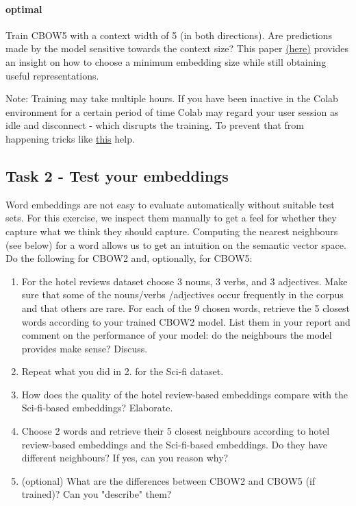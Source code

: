 \documentclass[fleqn,10pt]{SelfArx} %
\begin{document}
\paragraph{optimal} Train CBOW5 with a context width of 5 (in both directions). Are predictions made by the model sensitive towards the context size? This paper \href{https://aclanthology.org/I17-2006/}{(here)} provides an insight on how to choose a minimum embedding size while still obtaining useful representations.

Note: Training may take multiple hours. If you have been inactive in the Colab environment for a certain period of time Colab may regard your user session as idle and disconnect - which disrupts the training. To prevent that from happening tricks like \href{https://gist.github.com/RodolfoFerro/a12c664330c6eae601e5a828adfb8306}{this} help.

\subsection{Task 2 - Test your embeddings}
Word embeddings are not easy to evaluate automatically without suitable test sets. For this exercise, we inspect them manually to get a feel for whether they capture what we think they should capture. Computing the nearest neighbours (see below) for a word allows us to get an intuition on the semantic vector space. Do the following for CBOW2 and, optionally, for CBOW5:

\begin{enumerate}[noitemsep]
    \item For the hotel reviews dataset choose 3 nouns, 3 verbs, and 3 adjectives. Make sure that some of the nouns/verbs
    /adjectives occur frequently in the corpus and that others are rare. For each of the 9 chosen words, retrieve the 5 closest words according to your trained CBOW2 model. List them in your report and comment on the performance of your model: do the neighbours the model provides make sense? Discuss.
    \item Repeat what you did in 2. for the Sci-fi dataset.
    \item How does the quality of the hotel review-based embeddings compare with the Sci-fi-based embeddings? Elaborate.
    \item Choose 2 words and retrieve their 5 closest neighbours according to hotel review-based embeddings and the Sci-fi-based embeddings. Do they have different neighbours? If yes, can you reason why?
    \item (optional) What are the differences between CBOW2 and CBOW5 (if trained)? Can you "describe" them?
\end{enumerate}
\end{document}
